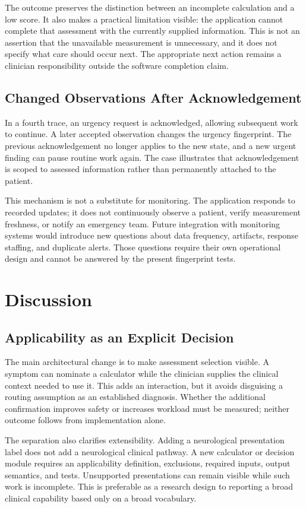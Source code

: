 \documentclass[conference]{IEEEtran}
\begin{document}
The outcome preserves the distinction between an incomplete calculation and a low score. It also makes a practical limitation visible: the application cannot complete that assessment with the currently supplied information. This is not an assertion that the unavailable measurement is unnecessary, and it does not specify what care should occur next. The appropriate next action remains a clinician responsibility outside the software completion claim.

\subsection{Changed Observations After Acknowledgement}
In a fourth trace, an urgency request is acknowledged, allowing subsequent work to continue. A later accepted observation changes the urgency fingerprint. The previous acknowledgement no longer applies to the new state, and a new urgent finding can pause routine work again. The case illustrates that acknowledgement is scoped to assessed information rather than permanently attached to the patient.

This mechanism is not a substitute for monitoring. The application responds to recorded updates; it does not continuously observe a patient, verify measurement freshness, or notify an emergency team. Future integration with monitoring systems would introduce new questions about data frequency, artifacts, response staffing, and duplicate alerts. Those questions require their own operational design and cannot be answered by the present fingerprint tests.

\section{Discussion}
\subsection{Applicability as an Explicit Decision}
The main architectural change is to make assessment selection visible. A symptom can nominate a calculator while the clinician supplies the clinical context needed to use it. This adds an interaction, but it avoids disguising a routing assumption as an established diagnosis. Whether the additional confirmation improves safety or increases workload must be measured; neither outcome follows from implementation alone.

The separation also clarifies extensibility. Adding a neurological presentation label does not add a neurological clinical pathway. A new calculator or decision module requires an applicability definition, exclusions, required inputs, output semantics, and tests. Unsupported presentations can remain visible while such work is incomplete. This is preferable as a research design to reporting a broad clinical capability based only on a broad vocabulary.
\end{document}
